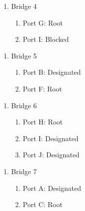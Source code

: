 \documentclass[12pt,addpoints,answers]{exam}
\begin{document}
\begin{questions}
\begin{parts}
\begin{solution}
\begin{enumerate}
	\item Bridge 4
	\begin{enumerate}
		\item Port G: Root
		\item Port I: Blocked
	\end{enumerate}
\end{enumerate}

\begin{enumerate}
	\item Bridge 5
	\begin{enumerate}
		\item Port B: Designated
		\item Port F: Root
	\end{enumerate}
\end{enumerate}

\begin{enumerate}
	\item Bridge 6
	\begin{enumerate}
		\item Port H: Root
		\item Port I: Designated
		\item Port J: Designated
	\end{enumerate}
\end{enumerate}

\begin{enumerate}
	\item Bridge 7
	\begin{enumerate}
		\item Port A: Designated
		\item Port C: Root
	\end{enumerate}
\end{enumerate}
\end{solution}
\end{parts}


\end{questions}
\end{document}

